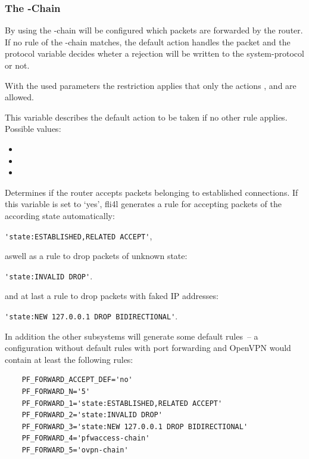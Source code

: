 \subsubsection{The -Chain}

By using the -chain will be configured which packets are
forwarded by the router. If no rule of the -chain matches,
the default action handles the packet and the protocol variable decides
wheter a rejection will be written to the system-protocol or not.

With the used parameters the restriction applies that only the actions
,  and  are allowed.

\begin{description}
This variable describes the default action to be taken if no other
rule applies. Possible values:

\begin{itemize}
\item {}
\item {}
\item {}
\end{itemize}

Determines if the router accepts packets belonging to established
connections. If this variable is set to `yes', fli4l generates
a rule for accepting packets of the according state automatically:

\verb+'state:ESTABLISHED,RELATED ACCEPT'+,

aswell as a rule to drop packets of unknown state:

\verb+'state:INVALID DROP'+.

and at last a rule to drop packets with faked IP addresses:

\verb+'state:NEW 127.0.0.1 DROP BIDIRECTIONAL'+.

In addition the other subsystems will generate some default rules~-- a
configuration without default rules with port forwarding and OpenVPN 
would contain at least the following rules:

\begin{example}
\begin{verbatim}
    PF_FORWARD_ACCEPT_DEF='no'
    PF_FORWARD_N='5'
    PF_FORWARD_1='state:ESTABLISHED,RELATED ACCEPT'
    PF_FORWARD_2='state:INVALID DROP'
    PF_FORWARD_3='state:NEW 127.0.0.1 DROP BIDIRECTIONAL'
    PF_FORWARD_4='pfwaccess-chain'
    PF_FORWARD_5='ovpn-chain'
\end{verbatim}
\end{example}


\end{description}
